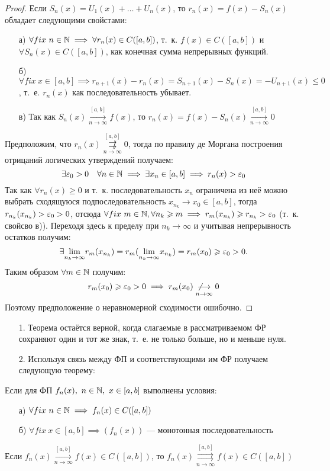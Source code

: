 \documentclass[../../main.tex]{subfiles}
\begin{document}
\begin{proof}
Если $S_n(x) = U_1(x) + \ldots + U_n(x)$, то $r_n(x) = f(x) - S_n(x)$ обладает
следующими свойстами:
	\begin{itemize}
		\item[а)] $\forall fix \ n \in \mathbb{N} \implies 
	\forall r_n(x) \in C([a,b])$, т.~к. $f(x) \in C([a,b])$ и
	$\forall S_n(x) \in C([a,b])$, как конечная сумма непрерывных функций.
		\item[б)] $\forall fix \ x \in [a,b] \implies 
	r_{n+1}(x) - r_n(x) = S_{n+1}(x) - S_n(x) = -U_{n+1}(x) \leq 0$, т.~е.
	$r_n(x)$ как последовательность убывает.
		\item[в)] Так как $S_n(x) \overset{[a,b]}
	{\underset{n \to \infty}\longrightarrow} f(x)$, то 
	$r_n(x) = f(x) - S_n(x) \overset{[a,b]}
	{\underset{n \to \infty}\longrightarrow} 0$
	\end{itemize}
Предположим, что $r_n(x) \overset{[a,b]}
{\underset{n \to \infty}{\not \rightrightarrows}} 0$, тогда по правилу
де Моргана построения отрицаний логических утверждений получаем: 
\[
\exists \varepsilon_0 > 0 \quad \forall n \in \mathbb{N} \implies 
\exists x_n \in [a,b] \implies r_n(x) > \varepsilon_0
\]
Так как $\forall r_n(x) \geq 0$ и т.~к. последовательность $x_n$ ограничена
из неё можно выбрать сходящуюся подпоследовательность 
$x_{n_k} \to x_0 \in [a,b]$, тогда $r_{n_k}(x_{n_k}) > \varepsilon_0 > 0$, отсюда
$\forall fix \ m \in \mathbb{N}, \forall n_k \geqslant m \implies r_m(x_{n_k}) \geqslant
r_{n_k} > \varepsilon_0$ (т.~к. свойсво в)). Переходя здесь к пределу при 
$n_k \to \infty$ и учитывая непрерывность остатков получим:
\[
\exists \underset{n_k \to \infty}{\lim} r_m(x_{n_k}) = 
r_m(\underset{n_k \to \infty}{\lim}x_{n_k}) = r_m(x_0) \geqslant
\varepsilon_0 > 0.
\]
Таким образом $\forall m \in \mathbb{N}$ получим: 
\[
r_m(x_0) \geqslant \varepsilon_0 > 0 \implies
r_m(x_0) \underset{n \to \infty}{\not \longrightarrow} 0
\]
Поэтому предположение о неравномерной сходимости ошибочно.
\end{proof}

\begin{rem}
	\begin{itemize}
		\item[1.] Теорема остаётся верной, когда слагаемые в рассматриваемом ФР
	сохраняют один и тот же знак, т.~е. не только больше, но и меньше нуля.
		\item[2.] Используя связь между ФП и соответствующими им ФР получаем
	следующую теорему:
	\end{itemize}
\end{rem}	
\begin{thm}
Если для ФП $f_n(x),\ n \in \mathbb{N},\ x \in [a,b]$ выполнены условия:
	\begin{itemize}
		\item[а)] $\forall fix \ n \in \mathbb{N} \implies
		f_n(x) \in C([a,b])$
		\item[б)] $\forall fix \ x \in [a,b] \implies
		(f_n(x))$ --- монотонная последовательность 
	\end{itemize}			
Если $f_n(x) \overset{[a,b]}
{\underset{n \to \infty}\longrightarrow} f(x) \in C([a,b])$, то
$f_n(x) \overset{[a,b]}
{\underset{n \to \infty}\rightrightarrows} f(x) \in C([a,b])$
\end{thm}  
\end{document}
